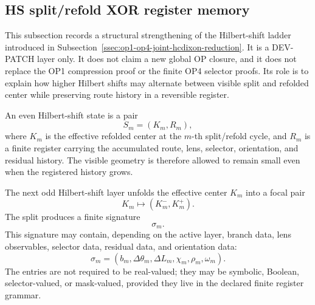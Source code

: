 
\subsection{HS split/refold XOR register memory}
\label{ssec:hs-split-refold-xor-register-memory}

\begin{remark}
\label{rem:r02-split-refold-scope}
This subsection records a structural strengthening of the Hilbert-shift
ladder introduced in Subsection~\ref{ssec:op1-op4-joint-hcdixon-reduction}.
It is a DEV-PATCH layer only.  It does not claim a new global OP closure,
and it does not replace the OP1 compression proof or the finite OP4
selector proofs.  Its role is to explain how higher Hilbert shifts may
alternate between visible split and refolded center while preserving
route history in a reversible register.
\end{remark}

\begin{definition}
\label{def:even-hs-state}
An even Hilbert-shift state is a pair
\[
  S_m=(K_m,R_m),
\]
where \(K_m\) is the effective refolded center at the \(m\)-th
split/refold cycle, and \(R_m\) is a finite register carrying the
accumulated route, lens, selector, orientation, and residual history.
The visible geometry is therefore allowed to remain small even when the
registered history grows.
\end{definition}

\begin{definition}
\label{def:focal-split-signature}
The next odd Hilbert-shift layer unfolds the effective center \(K_m\)
into a focal pair
\[
  K_m\longmapsto (K_m^-,K_m^+).
\]
The split produces a finite signature
\[
  \sigma_m.
\]
This signature may contain, depending on the active layer, branch data,
lens observables, selector data, residual data, and orientation data:
\[
  \sigma_m
  =
  (b_m,\Delta\theta_m,\Delta L_m,\chi_m,\rho_m,\omega_m).
\]
The entries are not required to be real-valued; they may be symbolic,
Boolean, selector-valued, or mask-valued, provided they live in the
declared finite register grammar.
\end{definition}

